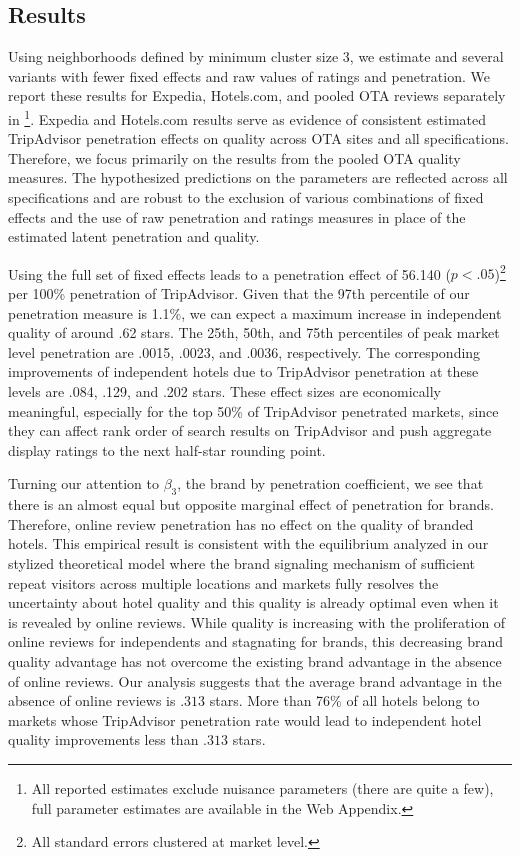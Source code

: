 \documentclass[mksc,blindrev]{informs3} %
\begin{document}
\subsection{Results}

Using neighborhoods defined by minimum cluster size 3, we estimate  and several variants with fewer fixed effects and raw values of ratings and penetration. We report these results for Expedia, Hotels.com, and pooled OTA reviews separately in \footnote{All reported estimates exclude nuisance parameters (there are quite a few), full parameter estimates are available in the Web Appendix.}. Expedia and Hotels.com results serve as evidence of consistent estimated TripAdvisor penetration effects on quality across OTA sites and all specifications. Therefore, we focus primarily on the results from the pooled OTA quality measures. The hypothesized predictions on the parameters are reflected across all specifications and are robust to the exclusion of various combinations of fixed effects and the use of raw penetration and ratings measures in place of the estimated latent penetration and quality. 

Using the full set of fixed effects leads to a penetration effect of 56.140 ($p<.05$)\footnote{All standard errors clustered at market level.} per 100\% penetration of TripAdvisor. Given that the 97th percentile of our penetration measure is 1.1\%, we can expect a maximum increase in independent quality of around .62 stars. The 25th, 50th, and 75th percentiles of peak market level penetration are .0015, .0023, and .0036, respectively. The corresponding improvements of independent hotels due to TripAdvisor penetration at these levels are .084, .129, and .202 stars. These effect sizes are economically meaningful, especially for the top 50\% of TripAdvisor penetrated markets, since they can affect rank order of search results on TripAdvisor and push aggregate display ratings to the next half-star rounding point.

Turning our attention to $\beta_3$, the brand by penetration coefficient, we see that there is an almost equal but opposite marginal effect of penetration for brands. Therefore, online review penetration has no effect on the quality of branded hotels. This empirical result is consistent with the equilibrium analyzed in our stylized theoretical model where the brand signaling mechanism of sufficient repeat visitors across multiple locations and markets fully resolves the uncertainty about hotel quality and this quality is already optimal even when it is revealed by online reviews. While quality is increasing with the proliferation of online reviews for independents and stagnating for brands, this decreasing brand quality advantage has not overcome the existing brand advantage in the absence of online reviews. Our analysis suggests that the average brand advantage in the absence of online reviews is $.313$ stars. More than 76\% of all hotels belong to markets whose TripAdvisor penetration rate would lead to independent hotel quality improvements less than $.313$ stars. 
\end{document}

